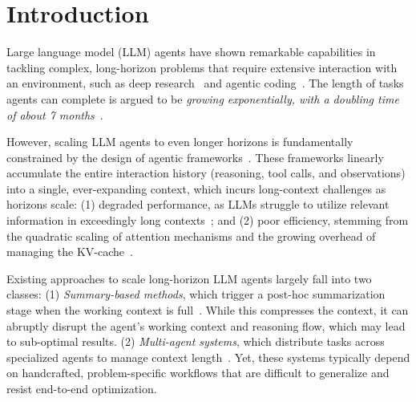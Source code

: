 \section{Introduction}
Large language model (LLM) agents have shown remarkable capabilities in tackling complex, long-horizon problems that require extensive interaction with an environment, such as deep research~\citep{OpenAI2025a,Google2025b,Jin2025SearchR1TL,Wei2025BrowseCompAS,Li2025WebThinkerEL} and agentic coding~\citep{Jimenez2023SWEbenchCL,AnthropicClaudeCode2025,Wang2024OpenHandsAO}. 
The length of tasks agents can complete is argued to be \textit{growing exponentially, with a doubling time of about 7 months}~\citep{METR2025a}.

However, scaling LLM agents to even longer horizons is fundamentally constrained by the design of agentic frameworks~\citep{Yao2022ReAct}. 
These frameworks linearly accumulate the entire interaction history (reasoning, tool calls, and observations) into a single, ever-expanding context, which incurs long-context challenges as horizons scale: (1) degraded performance, as LLMs struggle to utilize relevant information in exceedingly long contexts~\citep{Liu2023LostIT,Comanici2025Gemini2P,Leng2024LongCR}; and (2) poor efficiency, stemming from the quadratic scaling of attention mechanisms and the growing overhead of managing the KV-cache~\citep{Katharopoulos2020TransformersAR}.

Existing approaches to scale long-horizon LLM agents largely fall into two classes: 
(1) \textit{Summary-based methods}, which trigger a post-hoc summarization stage when the working context is full~\citep{OpenHands2025,Yu2025MemAgentRL,Qiao2025WebResearcherUU,Wu2025ReSumUL,Zhou2025MEM1LT,lu2025scaling}. While this compresses the context, it can abruptly disrupt the agent’s working context and reasoning flow, which may lead to sub-optimal results. 
(2) \textit{Multi-agent systems}, which distribute tasks across specialized agents to manage context length~\citep{Zhao2024LongAgentSL,Zhang2024ChainOA,Anthropic2025c,Wong2025WideSearchBA}. Yet, these systems typically depend on handcrafted, problem-specific workflows that are difficult to generalize and resist end-to-end optimization. 


